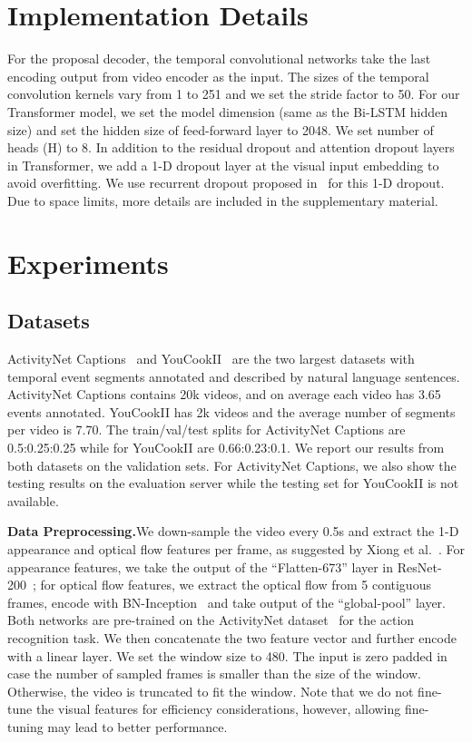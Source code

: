 \documentclass[10pt,twocolumn,letterpaper]{article}
\begin{document}
\section{Implementation Details}
For the proposal decoder, the temporal convolutional networks take the last encoding output from video encoder as the input. The sizes of the temporal convolution kernels vary from 1 to 251 and we set the stride factor  to 50. For our Transformer model, we set the model dimension  (same as the Bi-LSTM hidden size) and set the hidden size of feed-forward layer to 2048. We set number of heads (H) to 8. In addition to the residual dropout and attention dropout layers in Transformer, we add a 1-D dropout layer at the visual input embedding to avoid overfitting. We use recurrent dropout proposed in~\cite{gal2016theoretically} for this 1-D dropout. Due to space limits, more details are included in the supplementary material.

\section{Experiments}
\label{sec:exp}
\subsection{Datasets}
ActivityNet Captions~\cite{krishna2017dense} and YouCookII~\cite{zhou2017procnets} are the two largest datasets with temporal event segments annotated and described by natural language sentences. ActivityNet Captions contains 20k videos, and on average each video has 3.65 events annotated. 
YouCookII has 2k videos and the average number of segments per video is 7.70. The train/val/test splits for ActivityNet Captions are 0.5:0.25:0.25 while for YouCookII are 0.66:0.23:0.1. We report our results from both datasets on the validation sets. For ActivityNet Captions, we also show the testing results on the evaluation server while the testing set for YouCookII is not available.


\noindent\textbf{Data Preprocessing.}\quad We down-sample the video every 0.5s and extract the 1-D appearance and optical flow features per frame, as suggested by Xiong et al.~\cite{xiong2016cuhk}. For appearance features, we take the output of the ``Flatten-673'' layer in ResNet-200~\cite{he2016deep}; for optical flow features, we extract the optical flow from 5 contiguous frames, encode with BN-Inception~\cite{ioffe2015batch} and take output of the ``global-pool'' layer. Both networks are pre-trained on the ActivityNet dataset~\cite{caba2015activitynet} for the action recognition task. We then concatenate the two feature vector and further encode with a linear layer.
We set the window size  to 480. The input is zero padded in case the number of sampled frames is smaller than the size of the window. Otherwise, the video is truncated to fit the window.
Note that we do not fine-tune the visual features for efficiency considerations, however, allowing fine-tuning may lead to better performance.
\end{document}
